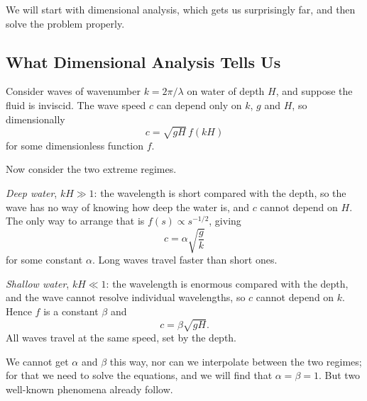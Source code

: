 \documentclass[a4paper]{scrartcl}
\begin{document}
\begin{center}
\end{center}

We will start with dimensional analysis, which gets us surprisingly far, and then solve the problem properly.

\subsection{What Dimensional Analysis Tells Us}

Consider waves of wavenumber $k = 2\pi/\lambda$ on water of depth $H$, and suppose the fluid is inviscid. The wave speed $c$ can depend only on $k$, $g$ and $H$, so dimensionally
$$
c = \sqrt{gH}\, f(kH)
$$
for some dimensionless function $f$.

Now consider the two extreme regimes.

\emph{Deep water}, $kH \gg 1$: the wavelength is short compared with the depth, so the wave has no way of knowing how deep the water is, and $c$ cannot depend on $H$. The only way to arrange that is $f(s) \propto s^{-1/2}$, giving
$$
c = \alpha\sqrt{\frac{g}{k}}
$$
for some constant $\alpha$. Long waves travel faster than short ones.

\emph{Shallow water}, $kH \ll 1$: the wavelength is enormous compared with the depth, and the wave cannot resolve individual wavelengths, so $c$ cannot depend on $k$. Hence $f$ is a constant $\beta$ and
$$
c = \beta\sqrt{gH}.
$$
All waves travel at the same speed, set by the depth.

We cannot get $\alpha$ and $\beta$ this way, nor can we interpolate between the two regimes; for that we need to solve the equations, and we will find that $\alpha = \beta = 1$. But two well-known phenomena already follow.
\end{document}
